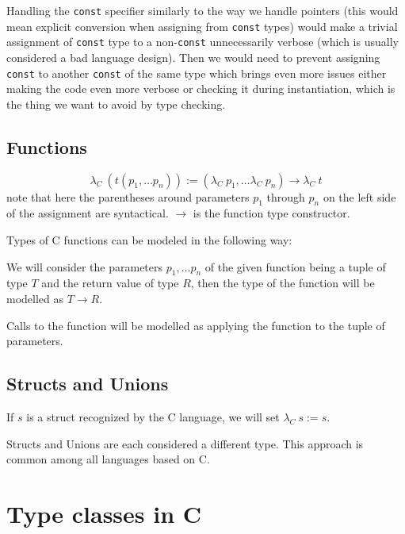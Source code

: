 Handling the \lstinline{const} specifier similarly to the way we handle pointers (this would mean explicit conversion when assigning from \lstinline{const} types) would make a trivial assignment of \lstinline{const} type to a non-\lstinline{const} unnecessarily verbose (which is usually considered a bad language design). Then we would need to prevent assigning \lstinline{const} to another \lstinline{const} of the same type which brings even more issues either making the code even more verbose or checking it during instantiation, which is the thing we want to avoid by type checking.

\subsection{Functions}

\begin{defn}
	$$\lambda_C\ (t(p_1, \dots p_n)) := (\lambda_C\ p_1, \dots \lambda_C\ p_n) \rightarrow \lambda_C\ t$$
	note that here the parentheses around parameters $p_1$ through $p_n$ on the left side of the assignment are syntactical. $\rightarrow$ is the function type constructor.
\end{defn}

Types of C functions can be modeled in the following way:

We will consider the parameters $p_1, \dots p_n$ of the given function being a tuple of type $T$ and the return value of type $R$, then the type of the function will be modelled as $T \rightarrow R$.

Calls to the function will be modelled as applying the function to the tuple of parameters.

\subsection{Structs and Unions}

\begin{defn}
	If $s$ is a struct recognized by the C language, we will set $\lambda_C\ s := s$.
\end{defn}

Structs and Unions are each considered a different type. This approach is common among all languages based on C.

\section{Type classes in C}

